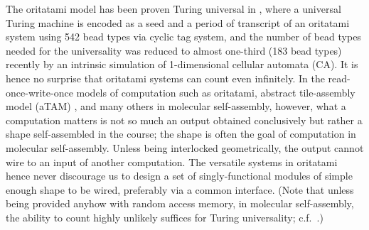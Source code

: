 \documentclass[twocolumn]{svjour3}
\begin{document}
The oritatami model has been proven Turing universal in \cite{GeMeScSe2018}, where a universal Turing machine is encoded as a seed and a period of transcript of an oritatami system using 542 bead types via cyclic tag system, and the number of bead types needed for the universality was reduced to almost one-third (183 bead types) recently \cite{PchelinaSSU2020} by an intrinsic simulation of 1-dimensional cellular automata (CA). 
It is hence no surprise that oritatami systems can count even infinitely. 
In the read-once-write-once models of computation such as oritatami, abstract tile-assembly model (aTAM) \cite{RothemundWinfree2000,WinfreePhD}, and many others in molecular self-assembly, however, what a computation matters is not so much an output obtained conclusively but rather a shape self-assembled in the course; the shape is often the goal of computation in molecular self-assembly. 
Unless being interlocked geometrically, the output cannot wire to an input of another computation. 
The versatile systems in oritatami \cite{GeMeScSe2018,PchelinaSSU2020} hence never discourage us to design a set of singly-functional modules of simple enough shape to be wired, preferably via a common interface. 
(Note that unless being provided anyhow with random access memory, in molecular self-assembly, the ability to count highly unlikely suffices for Turing universality; c.f.~\cite{Minsky1967}.)
\end{document}
